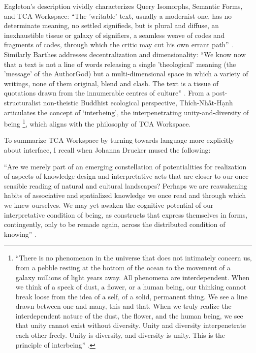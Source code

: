 Eagleton’s description vividly characterizes Query Isomorphs, Semantic Forms, and TCA Workspace: “The 'writable' text, usually a modernist one, has no determinate meaning, no settled signifieds, but is plural and diffuse, an inexhaustible tissue or galaxy of signifiers, a seamless weave of codes and fragments of codes, through which the critic may cut his own errant path” \citep[p. 119]{eagleton_literary_2006}. Similarly Barthes addresses decentralization and dimensionality: “We know now that a text is not a line of words releasing a single 'theological' meaning (the 'message' of the AuthorGod) but a multi-dimensional space in which a variety of writings, none of them original, blend and clash. The text is a tissue of quotations drawn from the innumerable centres of culture” \citep[p. 146]{barthes_image_1977}. From a post-structuralist non-theistic Buddhist ecological perspective, Thích-Nhất-Hạnh articulates the concept of  ‘interbeing’, the interpenetrating unity-and-diversity of being \citep[p. 80]{nhat_hanh_world_2008} \footnote{“There is no phenomenon in the universe that does not intimately concern us, from a pebble resting at the bottom of the ocean to the movement of a galaxy millions of light years away. All phenomena are interdependent. When we think of a speck of dust, a flower, or a human being, our thinking cannot break loose from the idea of a self, of a solid, permanent thing. We see a line drawn between one and many, this and that. When we truly realize the interdependent nature of the dust, the flower, and the human being, we see that unity cannot exist without diversity. Unity and diversity interpenetrate each other freely. Unity is diversity, and diversity is unity. This is the principle of interbeing” \citep[p. 80-81]{nhat_hanh_world_2008}.}, which aligns with the philosophy of TCA Workspace.

To summarize TCA Workspace by turning towards language more explicitly about interface, I recall when Johanna Drucker mused the following: 

“Are we merely part of an emerging constellation of potentialities for realization of aspects of knowledge design and interpretative acts that are closer to our once-sensible reading of natural and cultural landscapes? Perhaps we are reawakening habits of associative and spatialized knowledge we once read and through which we knew ourselves. We may yet awaken the cognitive potential of our interpretative condition of being, as constructs that express themselves in forms, contingently, only to be remade again, across the distributed condition of knowing” \citep[p. 192]{drucker_graphesis_2014}. 

